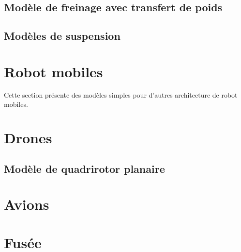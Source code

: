 \subsection{Modèle de freinage avec transfert de poids}


\subsection{Modèles de suspension}






\newpage
\section{Robot mobiles}

Cette section présente des modèles simples pour d'autres architecture de robot mobiles.





\newpage
\section{Drones}

\subsection{Modèle de quadrirotor planaire}



\newpage
\section{Avions}



\newpage
\section{Fusée}